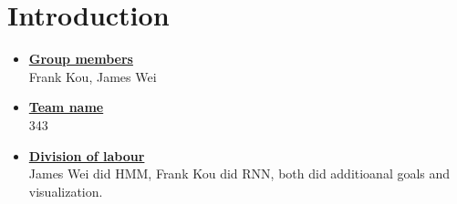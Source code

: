 \newif\ifshowsolutions
\showsolutionstrue

\newcommand{\boldline}[1]{\underline{\textbf{#1}}}



\pagestyle{fancy}






\section{Introduction}
\medskip
\begin{itemize}

    \item \boldline{Group members} \\
    Frank Kou, James Wei
    
    \item \boldline{Team name} \\
    343
    
    \item \boldline{Division of labour} \\
   	James Wei did HMM, Frank Kou did RNN, both did additioanal goals and visualization.

\end{itemize}

\newpage


